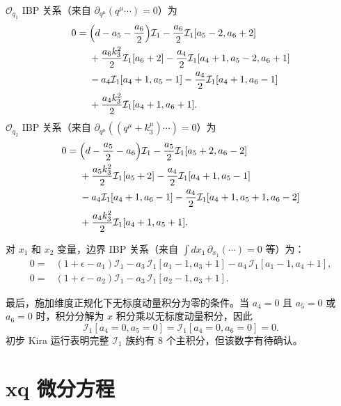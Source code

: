 ﻿\documentclass[a4paper,11pt]{article}
\begin{document}
$\mathcal{O}_{q_1}$ IBP 关系（来自 $\partial_{q^\mu}(q^\mu\cdots)=0$）为
\begin{align}
    0={}&\Bigl(d-a_5-\frac{a_6}{2}\Bigr)\mathcal{I}_1
        -\frac{a_6}{2}\mathcal{I}_1[a_5-2,a_6+2]\notag\\
    &+\frac{a_6 k_3^2}{2}\mathcal{I}_1[a_6+2]
        -\frac{a_4}{2}\mathcal{I}_1[a_4+1,a_5-2,a_6+1]\notag\\
    &-a_4\mathcal{I}_1[a_4+1,a_5-1]
        -\frac{a_4}{2}\mathcal{I}_1[a_4+1,a_6-1]\notag\\
    &+\frac{a_4 k_3^2}{2}\mathcal{I}_1[a_4+1,a_6+1].
    \label{IBPq1}
\end{align}
$\mathcal{O}_{q_2}$ IBP 关系（来自 $\partial_{q^\mu}((q^\mu+k_3^\mu)\cdots)=0$）为
\begin{align}
    0={}&\Bigl(d-\frac{a_5}{2}-a_6\Bigr)\mathcal{I}_1
        -\frac{a_5}{2}\mathcal{I}_1[a_5+2,a_6-2]\notag\\
    &+\frac{a_5 k_3^2}{2}\mathcal{I}_1[a_5+2]
        -\frac{a_4}{2}\mathcal{I}_1[a_4+1,a_5-1]\notag\\
    &-a_4\mathcal{I}_1[a_4+1,a_6-1]
        -\frac{a_4}{2}\mathcal{I}_1[a_4+1,a_5+1,a_6-2]\notag\\
    &+\frac{a_4 k_3^2}{2}\mathcal{I}_1[a_4+1,a_5+1].
    \label{IBPq2}
\end{align}

对 $x_1$ 和 $x_2$ 变量，边界 IBP 关系（来自 $\int dx_1\,\partial_{x_1}(\cdots)=0$ 等）为：
\begin{align}
    0={}&(1+\epsilon-a_1)\mathcal{I}_1
        -a_3\,\mathcal{I}_1[a_1-1,a_3+1]
        -a_4\,\mathcal{I}_1[a_1-1,a_4+1],\\
    0={}&(1+\epsilon-a_2)\mathcal{I}_1
        -a_3\,\mathcal{I}_1[a_2-1,a_3+1].
\end{align}

最后，施加维度正规化下无标度动量积分为零的条件。当 $a_4=0$ 且 $a_5=0$ 或 $a_6=0$ 时，积分分解为 $x$ 积分乘以无标度动量积分，因此
\begin{equation}
    \mathcal{I}_1[a_4=0,a_5=0]=\mathcal{I}_1[a_4=0,a_6=0]=0.
\end{equation}
初步 Kira 运行表明完整 $\mathcal{I}_1$ 族约有 $8$ 个主积分，但该数字有待确认。


\newpage
\section{xq 微分方程}
\end{document}
